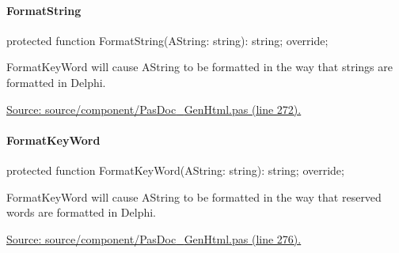 \documentclass{report}
\newif\ifpdf
\begin{document}
\paragraph*{FormatString}\hspace*{\fill}

\label{PasDoc_GenHtml.TGenericHTMLDocGenerator-FormatString}
\begin{list}{}{
\setlength{\itemindent}{0cm}
\setlength{\listparindent}{0cm}
\setlength{\leftmargin}{\evensidemargin}
\addtolength{\leftmargin}{\tmplength}
\settowidth{\labelsep}{X}
\addtolength{\leftmargin}{\labelsep}
\setlength{\labelwidth}{\tmplength}
}
\item[\textbf{Declaration}\hfill]
\ifpdf
\begin{flushleft}
\fi
\begin{ttfamily}
protected function FormatString(AString: string): string; override;\end{ttfamily}

\ifpdf
\end{flushleft}
\fi

\par
\item[\textbf{Description}]
FormatKeyWord will cause AString to be formatted in the way that strings are formatted in Delphi.\par
\href{https://github.com/pasdoc/pasdoc/blob/master/source/component/PasDoc_GenHtml.pas#L272}{Source: source/component/PasDoc{\_}GenHtml.pas (line 272).}

\end{list}
\paragraph*{FormatKeyWord}\hspace*{\fill}

\label{PasDoc_GenHtml.TGenericHTMLDocGenerator-FormatKeyWord}
\begin{list}{}{
\setlength{\itemindent}{0cm}
\setlength{\listparindent}{0cm}
\setlength{\leftmargin}{\evensidemargin}
\addtolength{\leftmargin}{\tmplength}
\settowidth{\labelsep}{X}
\addtolength{\leftmargin}{\labelsep}
\setlength{\labelwidth}{\tmplength}
}
\item[\textbf{Declaration}\hfill]
\ifpdf
\begin{flushleft}
\fi
\begin{ttfamily}
protected function FormatKeyWord(AString: string): string; override;\end{ttfamily}

\ifpdf
\end{flushleft}
\fi

\par
\item[\textbf{Description}]
FormatKeyWord will cause AString to be formatted in the way that reserved words are formatted in Delphi.\par
\href{https://github.com/pasdoc/pasdoc/blob/master/source/component/PasDoc_GenHtml.pas#L276}{Source: source/component/PasDoc{\_}GenHtml.pas (line 276).}

\end{list}
\end{document}
